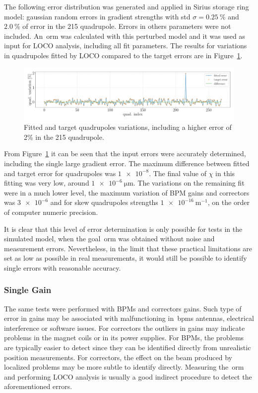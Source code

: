 The following error distribution was generated and applied in Sirius storage ring model: gaussian random errors in gradient strengths with std $\sigma=\SI{0.25}{\%}$ and $\SI{2.0}{\%}$ of error in the 215 quadrupole. Errors in others parameters were not included. An~\gls{orm} was calculated with this perturbed model and it was used as input for LOCO analysis, including all fit parameters. The results for variations in quadrupoles fitted by LOCO compared to the target errors are in Figure~\ref{fig:single_quad_detec}.
\begin{figure}[h!]
\centering
\includegraphics[width=1.0\textwidth]{figures/single_quaderror_detection_big.pdf}
\caption{Fitted and target quadrupoles variations, including a higher error of 2\% in the 215 quadrupole.}
\label{fig:single_quad_detec}
\end{figure}

From Figure~\ref{fig:single_quad_detec} it can be seen that the input errors were accurately determined, including the single large gradient error. The maximum difference between fitted and target error for quadrupoles was $\num{1e-8}$. The final value of $\chi$ in this fitting was very low, around $\SI{1e-6}{\micro\meter}$. The variations on the remaining fit were in a much lower level, the maximum variation of BPM gains and correctors was $\num{3e-6}$ and for skew quadrupoles strengths $\SI{1e-16}{\meter^{-1}}$, on the order of computer numeric precision.

It is clear that this level of error determination is only possible for tests in the simulated model, when the goal~\gls{orm} was obtained without noise and measurement errors. Nevertheless, in the limit that these practical limitations are set as low as possible in real measurements, it would still be possible to identify single errors with reasonable accuracy.
\subsubsection{Single Gain}
The same tests were performed with BPMs and correctors gains. Such type of error in gains may be associated with malfunctioning in~\glspl{bpm} antennas, electrical interference or software issues. For correctors the outliers in gains may indicate problems in the magnet coils or in its power supplies. For BPMs, the problems are typically easier to detect since they can be identified directly from unrealistic position measurements. For correctors, the effect on the beam produced by localized problems may be more subtle to identify directly. Measuring the~\gls{orm} and performing LOCO analysis is usually a good indirect procedure to detect the aforementioned errors.


